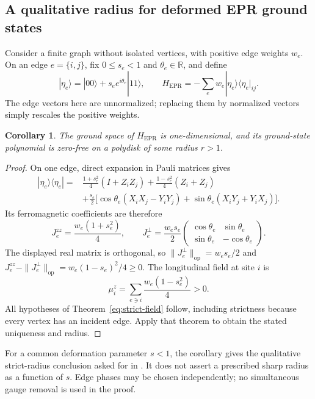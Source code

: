 \documentclass[reqno]{amsart}
\newtheorem{corollary}[theorem]{Corollary}
\theoremstyle{definition}
\theoremstyle{remark}
\newcommand{\R}{\mathbb R}
\begin{document}
\subsection{A qualitative radius for deformed EPR ground states}

Consider a finite graph without isolated vertices, with positive edge
weights \(w_e\).  On an edge \(e=\{i,j\}\), fix
\(0\le s_e<1\) and \(\theta_e\in\R\), and define
\[
 |\eta_e\rangle=|00\rangle+s_e e^{i\theta_e}|11\rangle,
 \qquad H_{\mathrm{EPR}}=-\sum_e w_e
 |\eta_e\rangle\langle\eta_e|_{ij}.
\]
The edge vectors here are unnormalized; replacing them by normalized
vectors simply rescales the positive weights.

\begin{corollary}\label{eq:epr}
The ground space of \(H_{\mathrm{EPR}}\) is one-dimensional, and
its ground-state polynomial is zero-free on a polydisk of some radius
\(r>1\).
\end{corollary}
\begin{proof}
On one edge, direct expansion in Pauli matrices gives
\begin{align*}
 |\eta_e\rangle\langle\eta_e|
 ={}&\frac{1+s_e^2}{4}(I+Z_iZ_j)
    +\frac{1-s_e^2}{4}(Z_i+Z_j)\\
 &+\frac{s_e}{2}\bigl[
      \cos\theta_e(X_iX_j-Y_iY_j)
      +\sin\theta_e(X_iY_j+Y_iX_j)\bigr].
\end{align*}
Its ferromagnetic coefficients are therefore
\[
 J_e^{zz}=\frac{w_e(1+s_e^2)}4,\qquad
 J_e^\perp=\frac{w_es_e}{2}
 \begin{pmatrix}\cos\theta_e&\sin\theta_e\\
                 \sin\theta_e&-\cos\theta_e\end{pmatrix}.
\]
The displayed real matrix is orthogonal, so
\(\|J_e^\perp\|_{\mathrm{op}}=w_es_e/2\) and
\(J_e^{zz}-\|J_e^\perp\|_{\mathrm{op}}
 =w_e(1-s_e)^2/4\ge0\).  The longitudinal field at site \(i\) is
\[
 \mu_i^z=\sum_{e\ni i}\frac{w_e(1-s_e^2)}4>0.
\]
All hypotheses of Theorem~\ref{eq:strict-field} follow, including
strictness because every vertex has an incident edge.  Apply that
theorem to obtain the stated uniqueness and radius.
\end{proof}

For a common deformation parameter \(s<1\), the corollary gives
the qualitative strict-radius conclusion asked for in
\cite[Conjecture~1]{WBG26}.  It does not assert a prescribed sharp
radius as a function of \(s\).  Edge phases may be chosen
independently; no simultaneous gauge removal is used in the proof.
\end{document}
